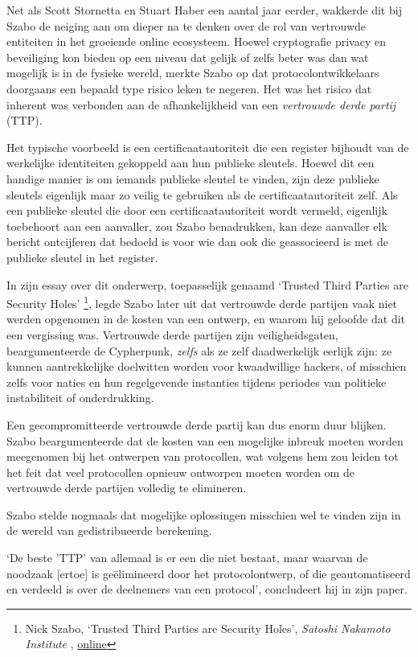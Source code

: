 \documentclass[
  a5paper,
  smalldemyvopaper,11pt,twoside,onecolumn,openright,extrafontsizes]{memoir}
\begin{document}
Net als Scott Stornetta en Stuart Haber een aantal jaar eerder, wakkerde
dit bij Szabo de neiging aan om dieper na te denken over de rol van
vertrouwde entiteiten in het groeiende online ecosysteem. Hoewel
cryptografie privacy en beveiliging kon bieden op een niveau dat gelijk
of zelfs beter was dan wat mogelijk is in de fysieke wereld, merkte
Szabo op dat protocolontwikkelaars doorgaans een bepaald type risico
leken te negeren. Het was het risico dat inherent was verbonden aan de
afhankelijkheid van een \emph{vertrouwde derde partij} (TTP).

Het typische voorbeeld is een certificaatautoriteit die een register
bijhoudt van de werkelijke identiteiten gekoppeld aan hun publieke
sleutels. Hoewel dit een handige manier is om iemands publieke sleutel
te vinden, zijn deze publieke sleutels eigenlijk maar zo veilig te
gebruiken als de certificaatautoriteit zelf. Als een publieke sleutel
die door een certificaatautoriteit wordt vermeld, eigenlijk toebehoort
aan een aanvaller, zou Szabo benadrukken, kan deze aanvaller elk bericht
ontcijferen dat bedoeld is voor wie dan ook die geassocieerd is met de
publieke sleutel in het register.

In zijn essay over dit onderwerp, toepasselijk genaamd `Trusted Third
Parties are Security Holes' \footnote{Nick Szabo, `Trusted Third Parties
  are Security Holes', \emph{Satoshi Nakamoto Institute} ,
  \href{https://nakamotoinstitute.org/library/trusted-third-parties/}{online}},
legde Szabo later uit dat vertrouwde derde partijen vaak niet werden
opgenomen in de kosten van een ontwerp, en waarom hij geloofde dat dit
een vergissing was. Vertrouwde derde partijen zijn veiligheidsgaten,
beargumenteerde de Cypherpunk, \emph{zelfs} als ze zelf daadwerkelijk
eerlijk zijn: ze kunnen aantrekkelijke doelwitten worden voor
kwaadwillige hackers, of misschien zelfs voor naties en hun regelgevende
instanties tijdens periodes van politieke instabiliteit of
onderdrukking.

Een gecompromitteerde vertrouwde derde partij kan dus enorm duur
blijken. Szabo beargumenteerde dat de kosten van een mogelijke inbreuk
moeten worden meegenomen bij het ontwerpen van protocollen, wat volgens
hem zou leiden tot het feit dat veel protocollen opnieuw ontworpen
moeten worden om de vertrouwde derde partijen volledig te elimineren.

Szabo stelde nogmaals dat mogelijke oplossingen misschien wel te vinden
zijn in de wereld van gedistribueerde berekening.

`De beste 'TTP' van allemaal is er een die niet bestaat, maar waarvan de
noodzaak {[}ertoe{]} is geëlimineerd door het protocolontwerp, of die
geautomatiseerd en verdeeld is over de deelnemers van een protocol',
concludeert hij in zijn paper.
\end{document}

